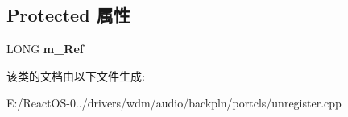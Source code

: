 \subsection*{Protected 属性}
\begin{DoxyCompactItemize}
\item 
\mbox{\label{class_c_unregister_subdevice_a58ae5629cbe5ea2d35db867f14a357d9}} 
L\+O\+NG {\bfseries m\+\_\+\+Ref}
\end{DoxyCompactItemize}


该类的文档由以下文件生成\+:\begin{DoxyCompactItemize}
\item 
E\+:/\+React\+O\+S-\/0../drivers/wdm/audio/backpln/portcls/unregister.\+cpp\end{DoxyCompactItemize}
